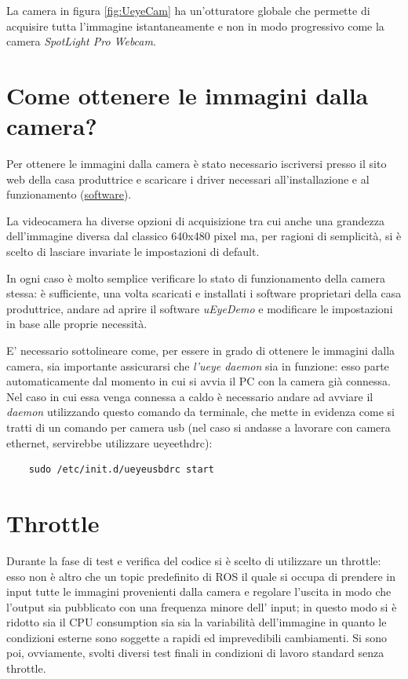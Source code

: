 La camera in figura \ref{fig:UeyeCam} ha un'otturatore globale che permette di acquisire tutta l'immagine istantaneamente e non in modo progressivo come la camera  \textit{SpotLight Pro Webcam}.

\section{Come ottenere le immagini dalla camera?}
\label{section:deamonCameraUeye}
Per ottenere le immagini dalla camera è stato necessario iscriversi presso il sito web della casa produttrice e scaricare i driver necessari all'installazione e al funzionamento (\href{https://en.ids-imaging.com/manuals-ueye-software.html}{software}).

La videocamera ha diverse opzioni di acquisizione tra cui anche una grandezza dell'immagine diversa dal classico 640x480 pixel ma, per ragioni di semplicità, si è scelto di lasciare invariate le impostazioni di default.

In ogni caso è molto semplice verificare lo stato di funzionamento della camera stessa: è sufficiente, una volta scaricati e installati i software proprietari della casa produttrice, andare ad aprire il software \textit{uEyeDemo} e modificare le impostazioni in base alle proprie necessità.

E' necessario sottolineare come, per essere in grado di ottenere le immagini dalla camera, sia importante assicurarsi che \textit{l'ueye daemon} sia in funzione: esso parte automaticamente dal momento in cui si avvia il PC con la camera già connessa. Nel caso in cui essa venga connessa a caldo è necessario andare ad avviare il \textit{daemon} utilizzando questo comando da terminale, che mette in evidenza come si tratti di un comando per camera usb (nel caso si andasse a lavorare con camera ethernet, servirebbe utilizzare ueyeethdrc):

\begin{lstlisting}
	sudo /etc/init.d/ueyeusbdrc start
\end{lstlisting}
\section{Throttle}
Durante la fase di test e verifica del codice si è scelto di utilizzare un throttle:
esso non è altro che un topic predefinito di ROS il quale si occupa di prendere in input tutte le immagini provenienti dalla camera e regolare l'uscita in modo che l'output sia pubblicato con una frequenza minore dell' input; in questo modo si è ridotto sia il CPU consumption sia sia la variabilità dell'immagine in quanto le condizioni esterne sono soggette a rapidi ed imprevedibili cambiamenti.
Si sono poi, ovviamente, svolti diversi test finali in condizioni di lavoro standard senza throttle.
